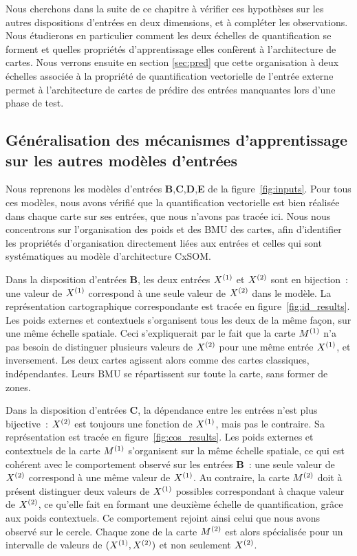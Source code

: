 \documentclass[../main]{subfiles}
\begin{document}
Nous cherchons dans la suite de ce chapitre à vérifier ces hypothèses sur les autres dispositions d'entrées en deux dimensions, et à compléter les observations.
Nous étudierons en particulier comment les deux échelles de quantification se forment et quelles propriétés d'apprentissage elles confèrent à l'architecture de cartes.
Nous verrons ensuite en section \ref{sec:pred} que cette organisation à deux échelles associée à la propriété de quantification vectorielle de l'entrée externe permet à l'architecture de cartes de prédire des entrées manquantes lors d'une phase de test.

\subsection{Généralisation des mécanismes d'apprentissage sur les autres modèles d'entrées}

Nous reprenons les modèles d'entrées \textbf{B},\textbf{C},\textbf{D},\textbf{E} de la figure~\ref{fig:inputs}.
Pour tous ces modèles, nous avons vérifié que la quantification vectorielle est bien réalisée dans chaque carte sur ses entrées, que nous n'avons pas tracée ici.
Nous nous concentrons sur l'organisation des poids et des BMU des cartes, afin d'identifier les propriétés d'organisation directement liées aux entrées et celles qui sont systématiques au modèle d'architecture CxSOM.

Dans la disposition d'entrées \textbf{B}, les deux entrées $X^{({1})}$ et $X^{({2})}$ sont en bijection~: une valeur de $X^{({1})}$ correspond à une seule valeur de $X^{({2})}$ dans le modèle.
La représentation cartographique correspondante est tracée en figure~\ref{fig:id_results}.
Les poids externes et contextuels s'organisent tous les deux de la même façon, sur une même échelle spatiale. Ceci s'expliquerait par le fait que la carte $M^{({1})}$ n'a pas besoin de distinguer plusieurs valeurs de $X^{({2})}$ pour une même entrée $X^{({1})}$, et inversement. Les deux cartes agissent alors comme des cartes classiques, indépendantes. Leurs BMU se répartissent sur toute la carte, sans former de zones.


Dans la disposition d'entrées \textbf{C}, la dépendance entre les entrées n'est plus bijective~: $X^{({2})}$ est toujours une fonction de $X^{({1})}$, mais pas le contraire. Sa représentation est tracée en figure~\ref{fig:cos_results}.
Les poids externes et contextuels de la carte $M^{({1})}$ s'organisent sur la même échelle spatiale, ce qui est cohérent avec le comportement observé sur les entrées \textbf{B}~: une seule valeur de $X^{({2})}$ correspond à une même valeur de $X^{({1})}$.
Au contraire, la carte $M^{({2})}$ doit à présent distinguer deux valeurs de $X^{({1})}$ possibles correspondant à chaque valeur de $X^{({2})}$, ce qu'elle fait en formant une deuxième échelle de quantification, grâce aux poids contextuels. Ce comportement rejoint ainsi celui que nous avons observé sur le cercle. Chaque zone de la carte $M^{({2})}$ est alors spécialisée pour un intervalle de valeurs de $(X^{({1})}, X^{({2})})$ et non seulement $X^{({2})}$.
\end{document}
